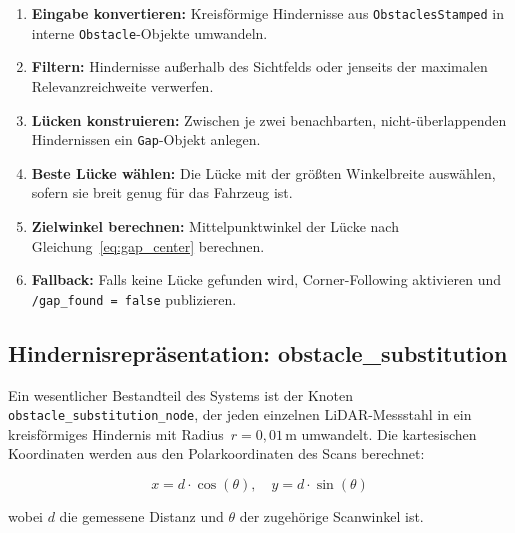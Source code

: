 \begin{enumerate}[leftmargin=*, label=\textbf{Schritt \arabic*.}]
    \item \textbf{Eingabe konvertieren:} Kreisförmige Hindernisse aus
    \texttt{ObstaclesStamped} in interne \texttt{Obstacle}-Objekte umwandeln.
    \item \textbf{Filtern:} Hindernisse außerhalb des Sichtfelds oder
    jenseits der maximalen Relevanzreichweite verwerfen.
    \item \textbf{Lücken konstruieren:} Zwischen je zwei benachbarten,
    nicht-überlappenden Hindernissen ein \texttt{Gap}-Objekt anlegen.
    \item \textbf{Beste Lücke wählen:} Die Lücke mit der größten
    Winkelbreite auswählen, sofern sie breit genug für das Fahrzeug ist.
    \item \textbf{Zielwinkel berechnen:} Mittelpunktwinkel der Lücke
    nach Gleichung~\eqref{eq:gap_center} berechnen.
    \item \textbf{Fallback:} Falls keine Lücke gefunden wird, Corner-Following
    aktivieren und \texttt{/gap\_found\,=\,false} publizieren.
\end{enumerate}

\subsection{Hindernisrepräsentation: obstacle\_substitution}

Ein wesentlicher Bestandteil des Systems ist der Knoten
\texttt{obstacle\_substitution\_node}, der jeden einzelnen
LiDAR-Messstahl in ein kreisförmiges Hindernis mit Radius~$r = 0{,}01$\,m
umwandelt. Die kartesischen Koordinaten werden aus den Polarkoordinaten
des Scans berechnet:

\begin{equation}
    x = d \cdot \cos(\theta), \quad y = d \cdot \sin(\theta)
    \label{eq:polar2cart}
\end{equation}

wobei $d$ die gemessene Distanz und $\theta$ der zugehörige Scanwinkel ist.
